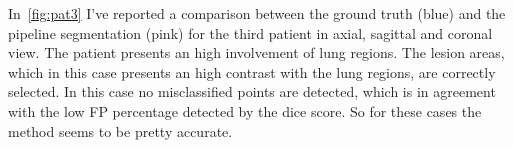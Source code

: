 \documentclass{standalone}
\begin{document}
 	In \figurename\,\ref{fig:pat3} I've reported a comparison between the ground truth (blue) and the pipeline segmentation (pink) for the third patient in axial, sagittal and coronal view. The patient presents an high involvement of lung regions.  The lesion areas, which  in this case presents an high contrast with the lung regions, are correctly selected. In this case no misclassified points are detected, which is in agreement with the low FP percentage detected by the dice score. So for these cases the method seems to be pretty accurate.
 	
 	
	
\end{document}
